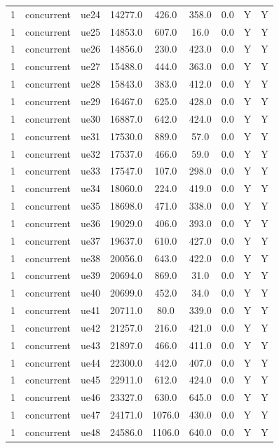 \begin{table}[ht]
\begin{tabular}{|c|c|c|c|c|c|c|c|c|}
1 & concurrent & ue24 & 14277.0 & 426.0 & 358.0 & 0.0 & Y & Y \\
1 & concurrent & ue25 & 14853.0 & 607.0 & 16.0 & 0.0 & Y & Y \\
1 & concurrent & ue26 & 14856.0 & 230.0 & 423.0 & 0.0 & Y & Y \\
1 & concurrent & ue27 & 15488.0 & 444.0 & 363.0 & 0.0 & Y & Y \\
1 & concurrent & ue28 & 15843.0 & 383.0 & 412.0 & 0.0 & Y & Y \\
1 & concurrent & ue29 & 16467.0 & 625.0 & 428.0 & 0.0 & Y & Y \\
1 & concurrent & ue30 & 16887.0 & 642.0 & 424.0 & 0.0 & Y & Y \\
1 & concurrent & ue31 & 17530.0 & 889.0 & 57.0 & 0.0 & Y & Y \\
1 & concurrent & ue32 & 17537.0 & 466.0 & 59.0 & 0.0 & Y & Y \\
1 & concurrent & ue33 & 17547.0 & 107.0 & 298.0 & 0.0 & Y & Y \\
1 & concurrent & ue34 & 18060.0 & 224.0 & 419.0 & 0.0 & Y & Y \\
1 & concurrent & ue35 & 18698.0 & 471.0 & 338.0 & 0.0 & Y & Y \\
1 & concurrent & ue36 & 19029.0 & 406.0 & 393.0 & 0.0 & Y & Y \\
1 & concurrent & ue37 & 19637.0 & 610.0 & 427.0 & 0.0 & Y & Y \\
1 & concurrent & ue38 & 20056.0 & 643.0 & 422.0 & 0.0 & Y & Y \\
1 & concurrent & ue39 & 20694.0 & 869.0 & 31.0 & 0.0 & Y & Y \\
1 & concurrent & ue40 & 20699.0 & 452.0 & 34.0 & 0.0 & Y & Y \\
1 & concurrent & ue41 & 20711.0 & 80.0 & 339.0 & 0.0 & Y & Y \\
1 & concurrent & ue42 & 21257.0 & 216.0 & 421.0 & 0.0 & Y & Y \\
1 & concurrent & ue43 & 21897.0 & 466.0 & 411.0 & 0.0 & Y & Y \\
1 & concurrent & ue44 & 22300.0 & 442.0 & 407.0 & 0.0 & Y & Y \\
1 & concurrent & ue45 & 22911.0 & 612.0 & 424.0 & 0.0 & Y & Y \\
1 & concurrent & ue46 & 23327.0 & 630.0 & 645.0 & 0.0 & Y & Y \\
1 & concurrent & ue47 & 24171.0 & 1076.0 & 430.0 & 0.0 & Y & Y \\
1 & concurrent & ue48 & 24586.0 & 1106.0 & 640.0 & 0.0 & Y & Y \\

\end{tabular}
\end{table}
